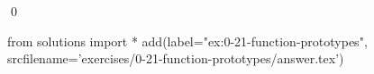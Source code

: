 
\begin{ex}
  \label{ex:0-21-function-prototypes}
  
  \qed
\end{ex}
\begin{python0}
from solutions import *
add(label="ex:0-21-function-prototypes",
    srcfilename='exercises/0-21-function-prototypes/answer.tex')
\end{python0}
